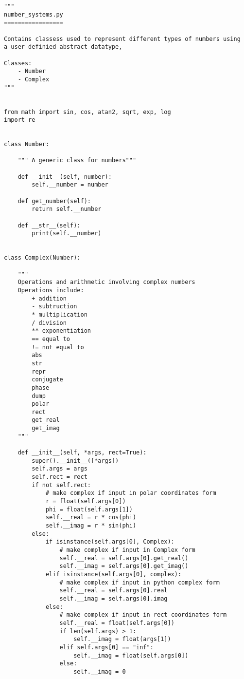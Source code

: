 \documentclass{article}
\begin{document}
\begin{lstlisting}
"""
number_systems.py
=================

Contains classess used to represent different types of numbers using
a user-definied abstract datatype,

Classes:
    - Number
    - Complex
"""


from math import sin, cos, atan2, sqrt, exp, log
import re


class Number:

    """ A generic class for numbers"""

    def __init__(self, number):
        self.__number = number

    def get_number(self):
        return self.__number

    def __str__(self):
        print(self.__number)


class Complex(Number):

    """
    Operations and arithmetic involving complex numbers
    Operations include:
        + addition
        - subtruction
        * multiplication
        / division
        ** exponentiation
        == equal to
        != not equal to
        abs
        str
        repr
        conjugate
        phase
        dump
        polar
        rect
        get_real
        get_imag
    """

    def __init__(self, *args, rect=True):
        super().__init__([*args])
        self.args = args
        self.rect = rect
        if not self.rect:
            # make complex if input in polar coordinates form
            r = float(self.args[0])
            phi = float(self.args[1])
            self.__real = r * cos(phi)
            self.__imag = r * sin(phi)
        else:
            if isinstance(self.args[0], Complex):
                # make complex if input in Complex form
                self.__real = self.args[0].get_real()
                self.__imag = self.args[0].get_imag()
            elif isinstance(self.args[0], complex):
                # make complex if input in python complex form
                self.__real = self.args[0].real
                self.__imag = self.args[0].imag
            else:
                # make complex if input in rect coordinates form
                self.__real = float(self.args[0])
                if len(self.args) > 1:
                    self.__imag = float(args[1])
                elif self.args[0] == "inf":
                    self.__imag = float(self.args[0])
                else:
                    self.__imag = 0


\end{lstlisting}
\end{document}
